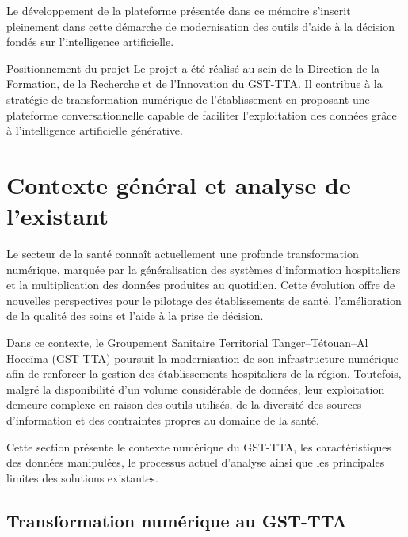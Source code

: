 Le développement de la plateforme présentée dans ce mémoire s'inscrit pleinement dans cette démarche de modernisation des outils d'aide à la décision fondés sur l'intelligence artificielle.

\begin{infobox}{Positionnement du projet}
Le projet a été réalisé au sein de la Direction de la Formation, de la Recherche et de l'Innovation du GST-TTA. Il contribue à la stratégie de transformation numérique de l'établissement en proposant une plateforme conversationnelle capable de faciliter l'exploitation des données grâce à l'intelligence artificielle générative.
\end{infobox}

\section{Contexte général et analyse de l'existant}

Le secteur de la santé connaît actuellement une profonde transformation numérique, marquée par la généralisation des systèmes d'information hospitaliers et la multiplication des données produites au quotidien. Cette évolution offre de nouvelles perspectives pour le pilotage des établissements de santé, l'amélioration de la qualité des soins et l'aide à la prise de décision.

Dans ce contexte, le Groupement Sanitaire Territorial Tanger--Tétouan--Al Hoceïma (GST-TTA) poursuit la modernisation de son infrastructure numérique afin de renforcer la gestion des établissements hospitaliers de la région. Toutefois, malgré la disponibilité d'un volume considérable de données, leur exploitation demeure complexe en raison des outils utilisés, de la diversité des sources d'information et des contraintes propres au domaine de la santé.

Cette section présente le contexte numérique du GST-TTA, les caractéristiques des données manipulées, le processus actuel d'analyse ainsi que les principales limites des solutions existantes.

\subsection{Transformation numérique au GST-TTA}

